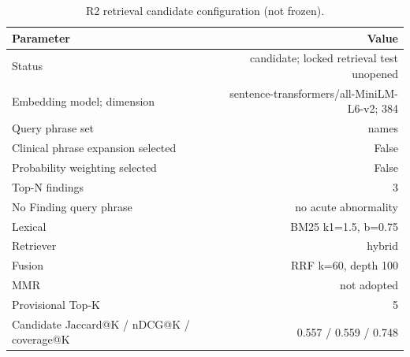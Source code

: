 \begin{table}[t]
\centering
\scriptsize
\begin{tabular}{lr}
\hline
Parameter & Value \\
\hline
Status & candidate; locked retrieval test unopened \\
Embedding model; dimension & sentence-transformers/all-MiniLM-L6-v2; 384 \\
Query phrase set & names \\
Clinical phrase expansion selected & False \\
Probability weighting selected & False \\
Top-N findings & 3 \\
No Finding query phrase & no acute abnormality \\
Lexical & BM25 k1=1.5, b=0.75 \\
Retriever & hybrid \\
Fusion & RRF k=60, depth 100 \\
MMR & not adopted \\
Provisional Top-K & 5 \\
Candidate Jaccard@K / nDCG@K / coverage@K & 0.557 / 0.559 / 0.748 \\
\hline
\end{tabular}
\caption{R2 retrieval candidate configuration (not frozen).}
\label{tab:table5_final_r2_candidate_configuration}
\end{table}
